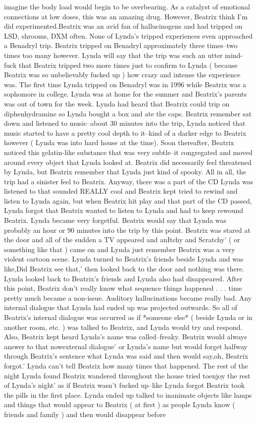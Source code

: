 \documentclass[12pt]{book}
\begin{document}
imagine the body load would begin to be overbearing. As a catalyst of emotional connections at low doses, this was an amazing drug. However, Beatrix think I'm did experimented.Beatrix was an avid fan of hallucinogens and had tripped on LSD, shrooms, DXM often. None of Lynda's tripped experiences even approached a Benadryl trip. Beatrix tripped on Benadryl approximately three times--two times too many however. Lynda will say that the trip was such an utter mind-fuck that Beatrix tripped two more times just to confirm to Lynda ( because Beatrix was so unbelievably fucked up ) how crazy and intense the experience was. The first time Lynda tripped on Benadryl was in 1996 while Beatrix was a sophomore in college. Lynda was at home for the summer and Beatrix's parents was out of town for the week. Lynda had heard that Beatrix could trip on diphenhydramine so Lynda bought a box and ate the caps. Beatrix remember sat down and listened to music--about 30 minutes into the trip, Lynda noticed that music started to have a pretty cool depth to it--kind of a darker edge to Beatrix however ( Lynda was into hard house at the time). Soon thereafter, Beatrix noticed this gelatin-like substance that was very subtle--it congregated and moved around every object that Lynda looked at. Beatrix did necessarily feel threatened by Lynda, but Beatrix remember that Lynda just kind of spooky. All in all, the trip had a sinister feel to Beatrix. Anyway, there was a part of the CD Lynda was listened to that sounded REALLY cool and Beatrix kept tried to rewind and listen to Lynda again, but when Beatrix hit play and that part of the CD passed, Lynda forgot that Beatrix wanted to listen to Lynda and had to keep rewound Beatrix. Lynda became very forgetful. Beatrix would say that Lynda was probably an hour or 90 minutes into the trip by this point. Beatrix was stared at the door and all of the sudden a TV appeared and anItchy and Scratchy' ( or something like that ) came on and Lynda just remember Beatrix was a very violent cartoon scene. Lynda turned to Beatrix's friends beside Lynda and was like,Did Beatrix see that,' then looked back to the door and nothing was there. Lynda looked back to Beatrix's friends and Lynda also had disappeared. After this point, Beatrix don't really know what sequence things happened . . .  time pretty much became a non-issue. Auditory hallucinations became really bad. Any internal dialogue that Lynda had ended up was projected outwards. So all of Beatrix's internal dialogue was occurred as if *someone else* ( beside Lynda or in another room, etc. ) was talked to Beatrix, and Lynda would try and respond. Also, Beatrix kept heard Lynda's name was called--freaky. Beatrix would always answer to that nowexternal dialogue' or Lynda's name but would forget halfway through Beatrix's sentence what Lynda was said and then would say,oh, Beatrix forgot.' Lynda can't tell Beatrix how many times that happened. The rest of the night Lynda found Beatrix wandered throughout the house tried toenjoy the rest of Lynda's night' as if Beatrix wasn't fucked up--like Lynda forgot Beatrix took the pills in the first place. Lynda ended up talked to inanimate objects like lamps and things that would appear to Beatrix ( at first ) as people Lynda know ( friends and family ) and then would disappear before 
\end{document}
